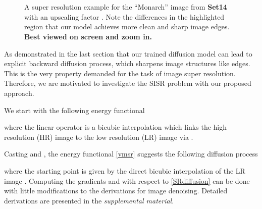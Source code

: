 \documentclass[10pt,journal,compsoc]{IEEEtran}
\begin{document}
\begin{figure*}[t!]
\centering
    \hfill
    \hfill
    \\
\vspace*{-0.15cm}
    \hfill
    \hfill
    \\
\vspace*{-0.25cm}
    \caption{A super resolution example for the ``Monarch'' image from \textbf{Set14} 
with an upscaling factor . Note the differences in the highlighted region that 
our model achieves more clean and sharp image edges. \textbf{Best viewed on screen and zoom in.}}\label{fig:SR}
\vspace*{-0.25cm}
\end{figure*}

As demonstrated in the last section that our trained diffusion model can lead to explicit backward diffusion process, which 
sharpens image structures like edges. This is the very property demanded for the task of image super resolution. Therefore, 
we are motivated to investigate the SISR problem with our proposed approach. 

We start with the following energy functional

where the linear operator  is a bicubic interpolation which 
links the high resolution (HR) image  to the low resolution (LR) image  via 
. 
\begin{comment}
Following the widely used framework proposed in \cite{ANR}, in this paper, the LR images are produced by down scaling 
the HR images via the bicubic interpolation. 
\end{comment}
Casting  and , 
the energy functional \eqref{vmsr} suggests the following diffusion process 

where the starting point  
is given by the direct bicubic interpolation of the LR image . 
Computing the gradients  and  with respect to 
\eqref{SRdiffusion} can be done with little modifications to the derivations for image denoising. 
Detailed derivations are presented in the \textit{supplemental material}. 
\end{document}
